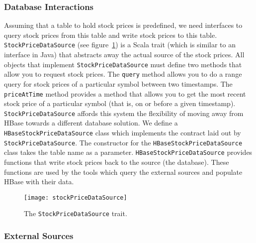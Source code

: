 \subsubsection{Database Interactions}

Assuming that a table to hold stock prices is predefined, we need interfaces to query stock prices from this table and write stock prices to this table. \texttt{StockPriceDataSource} (see figure~\ref{stockPriceDataSource}) is a Scala trait (which is similar to an interface in Java) that abstracts away the actual source of the stock prices. All objects that implement \texttt{StockPriceDataSource} must define two methods that allow you to request stock prices. The \texttt{query} method allows you to do a range query for stock prices of a particular symbol between two timestamps. The \texttt{priceAtTime} method provides a method that allows you to get the most recent stock price of a particular symbol (that is, on or before a given timestamp). \texttt{StockPriceDataSource} affords this system the flexibility of moving away from HBase towards a different database solution. We define a \texttt{HBaseStockPriceDataSource} class which implements the contract laid out by \texttt{StockPriceDataSource}. The constructor for the \texttt{HBaseStockPriceDataSource} class takes the table name as a parameter. \texttt{HBaseStockPriceDataSource} provides functions that write stock prices back to the source (the database). These functions are used by the tools which query the external sources and populate HBase with their data.

\begin{figure}[h]
  \label{stockPriceDataSource}
  \begin{center}
    \texttt{[image: stockPriceDataSource]}
  \end{center}
  \caption{The \texttt{StockPriceDataSource} trait.}
\end{figure}

\subsubsection{External Sources}

